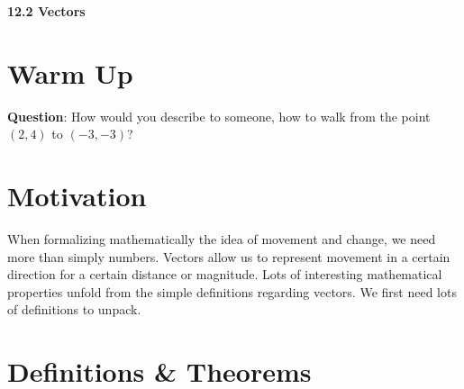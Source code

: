 \documentclass[11pt]{article}
\newcommand{\vs}{\vspace*{.1in}}
\begin{document}
\begin{LARGE}\begin{center}\bf 12.2 Vectors \end{center}
\end{LARGE}

\vs\vs



\section{Warm Up}

\textbf{Question}: How would you describe to someone, how to walk from the point $(2,4)$ to $(-3,-3)$? 

\section{Motivation}

When formalizing mathematically the idea of movement and change, we need more than simply numbers. Vectors allow us to represent movement in a certain direction for a certain distance or magnitude. Lots of interesting mathematical properties unfold from the simple definitions regarding vectors. We first need lots of definitions to unpack.




\section{Definitions \& Theorems}
\end{document}

